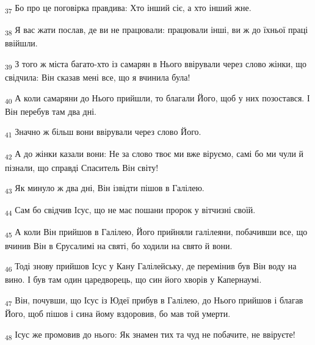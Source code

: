 \begin{tcolorbox}
\textsubscript{37} Бо про це поговірка правдива: Хто інший сіє, а хто інший жне.
\end{tcolorbox}
\begin{tcolorbox}
\textsubscript{38} Я вас жати послав, де ви не працювали: працювали інші, ви ж до їхньої праці ввійшли.
\end{tcolorbox}
\begin{tcolorbox}
\textsubscript{39} З того ж міста багато-хто із самарян в Нього ввірували через слово жінки, що свідчила: Він сказав мені все, що я вчинила була!
\end{tcolorbox}
\begin{tcolorbox}
\textsubscript{40} А коли самаряни до Нього прийшли, то благали Його, щоб у них позостався. І Він перебув там два дні.
\end{tcolorbox}
\begin{tcolorbox}
\textsubscript{41} Значно ж більш вони ввірували через слово Його.
\end{tcolorbox}
\begin{tcolorbox}
\textsubscript{42} А до жінки казали вони: Не за слово твоє ми вже віруємо, самі бо ми чули й пізнали, що справді Спаситель Він світу!
\end{tcolorbox}
\begin{tcolorbox}
\textsubscript{43} Як минуло ж два дні, Він ізвідти пішов в Галілею.
\end{tcolorbox}
\begin{tcolorbox}
\textsubscript{44} Сам бо свідчив Ісус, що не має пошани пророк у вітчизні своїй.
\end{tcolorbox}
\begin{tcolorbox}
\textsubscript{45} А коли Він прийшов в Галілею, Його прийняли галілеяни, побачивши все, що вчинив Він в Єрусалимі на святі, бо ходили на свято й вони.
\end{tcolorbox}
\begin{tcolorbox}
\textsubscript{46} Тоді знову прийшов Ісус у Кану Галілейську, де перемінив був Він воду на вино. І був там один царедворець, що син його хворів у Капернаумі.
\end{tcolorbox}
\begin{tcolorbox}
\textsubscript{47} Він, почувши, що Ісус із Юдеї прибув в Галілею, до Нього прийшов і благав Його, щоб пішов і сина йому вздоровив, бо мав той умерти.
\end{tcolorbox}
\begin{tcolorbox}
\textsubscript{48} Ісус же промовив до нього: Як знамен тих та чуд не побачите, не ввіруєте!
\end{tcolorbox}
